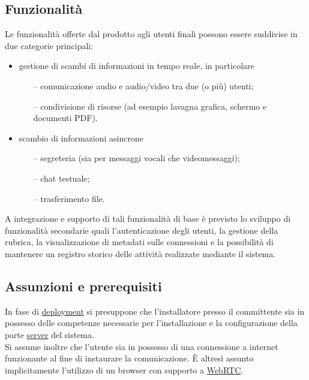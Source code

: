 \subsection{Funzionalità}
Le funzionalità offerte dal prodotto agli utenti finali possono essere suddivise in due categorie principali:
\begin{itemize}
  \item gestione di scambi di informazioni in tempo reale, in particolare
  \begin{itemize}
  \item[--] comunicazione audio e audio/video tra due (o più) utenti;
  \item[--] condivisione di risorse (ad esempio lavagna grafica, schermo e documenti PDF). 
  \end{itemize}
  \item scambio di informazioni asincrone 
  \begin{itemize}
  \item[--] segreteria (sia per messaggi vocali che videomessaggi);
  \item[--] chat testuale;
  \item[--] trasferimento file.
  \end{itemize}
\end{itemize}
A integrazione e supporto di tali funzionalità di base è previsto lo sviluppo di funzionalità secondarie quali l'autenticazione degli utenti, la gestione della rubrica, la visualizzazione di metadati sulle connessioni e la possibilità di mantenere un registro storico delle attività realizzate mediante il sistema.

\subsection{Assunzioni e prerequisiti}
In fase di \underline{deployment} si presuppone che l'installatore presso il committente sia in possesso delle competenze necessarie per l'installazione e la configurazione della parte \underline{server} del sistema.\\
Si assume inoltre che l'utente sia in possesso di una connessione a internet funzionante al fine di instaurare la comunicazione. È altresì assunto implicitamente l'utilizzo di un browser con supporto a \underline{WebRTC}.

\clearpage




